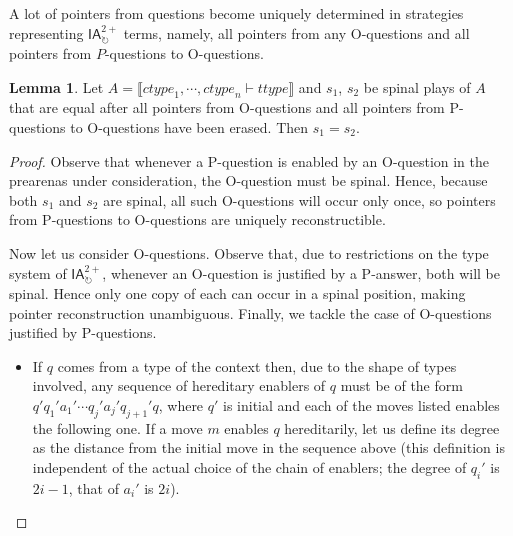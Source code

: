 \documentclass{CSML}
\theoremstyle{definition}\newtheorem{definition}[thm]{Definition}
\theoremstyle{definition}\newtheorem{example}[thm]{Example}
\theoremstyle{definition}\newtheorem{proposition}[thm]{Proposition}
\theoremstyle{definition}\newtheorem{lemma}[thm]{Lemma}
\theoremstyle{definition}\newtheorem{theorem}[thm]{Theorem}
\theoremstyle{definition}\newtheorem{corollary}[thm]{Corollary}
\theoremstyle{definition}\newtheorem{remark}[thm]{Remark}
\newcommand\nt[1]{#1}
\newcommand\ctype{\mathit{ctype}}
\newcommand\ttype{\mathit{ttype}}
\newcommand\ialoop{\mathsf{IA}_{\circlearrowright}}
\newcommand\iatwo{\ialoop^{2+}}
\newcommand\sem[1]{\llbracket #1 \rrbracket}
\newcommand\seq[2]{{#1} \vdash {#2}}
\begin{document}
\noindent A lot of pointers from questions become uniquely determined in strategies
representing $\iatwo$ terms, namely, all pointers from any O-questions and all
pointers from $P$-questions to O-questions.
\begin{lemma}\label{lem:pointers}
Let $A=\sem{\seq{\ctype_1,\cdots,\ctype_n}{\ttype}}$ and $s_1$, $s_2$ be spinal plays of $A$
that are equal after all pointers from O-questions and all pointers from P-questions
to O-questions have been erased. Then $s_1=s_2$.
\end{lemma}
\begin{proof}
Observe that whenever a P-question 
is enabled by an O-question in the \nt{prearenas} under consideration, the O-question must be spinal. Hence,
because both $s_1$ and $s_2$ are spinal, all such O-questions will
occur only once, so pointers from P-questions to O-questions are 
uniquely reconstructible.

Now let us consider O-questions. Observe that, due to restrictions on the type
system of $\iatwo$, whenever an O-question is justified by a P-answer, both will be
spinal. Hence only one copy of each can occur in a spinal position, making pointer
reconstruction unambiguous. Finally, we tackle the case of O-questions justified
by P-questions.

\begin{itemize}
\item If $q$ comes from a type of the context then, due to the shape of types involved,
any sequence of hereditary enablers of $q$ must be of the form 
$q'  q_1' a_1'\cdots q_j' a_j' q_{j+1}' q$, where $q'$
is initial and each of the moves listed enables the following one.
If a move $m$ enables $q$ hereditarily, let us define its degree
as the distance from the initial move in the sequence above
(this definition is independent of the actual choice of the chain
of enablers; the degree of $q_i'$ is $2i-1$,  that of $a_i'$ is $2i$).


\end{itemize}
\end{proof}
\end{document}
